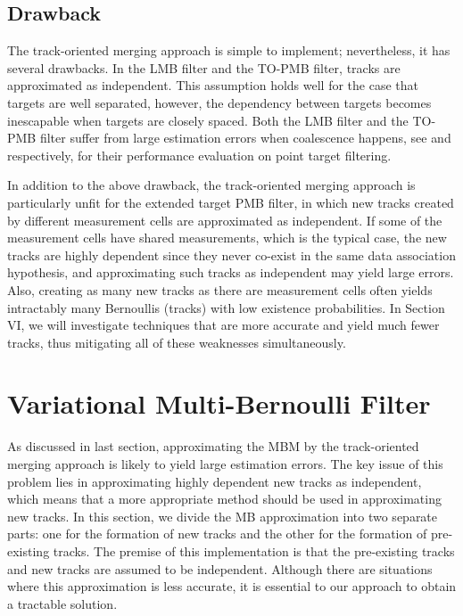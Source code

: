 \documentclass[journal]{IEEEtran}
\begin{document}

\subsection{Drawback}
The track-oriented merging approach is simple to implement; nevertheless, it has several drawbacks. In the LMB filter and the TO-PMB filter, tracks are approximated as independent. This assumption holds well for the case that targets are well separated, however, the dependency between targets becomes inescapable when targets are closely spaced. Both the LMB filter and the TO-PMB filter suffer from large estimation errors when coalescence happens, see \cite{performanceevaluation} and \cite{pmbmpoint} respectively, for their performance evaluation on point target filtering. 

In addition to the above drawback, the track-oriented merging approach is particularly unfit for the extended target PMB filter, in which new tracks created by different measurement cells are approximated as independent. If some of the measurement cells have shared measurements, which is the typical case, the new tracks are highly dependent since they never co-exist in the same data association hypothesis, and approximating such tracks as independent may yield large errors. Also, creating as many new tracks as there are measurement cells often yields intractably many Bernoullis (tracks) with low existence probabilities. In Section VI, we will investigate techniques that are more accurate and yield much fewer tracks, thus mitigating all of these weaknesses simultaneously.

\section{Variational Multi-Bernoulli Filter}

As discussed in last section, approximating the MBM by the track-oriented merging approach is likely to yield large estimation errors. The key issue of this problem lies in approximating highly dependent new tracks as independent, which means that a more appropriate method should be used in approximating new tracks. In this section, we divide the MB approximation into two separate parts: one for the formation of new tracks and the other for the formation of pre-existing tracks. The premise of this implementation is that the pre-existing tracks and new tracks are assumed to be independent. Although there are situations where this approximation is less accurate, it is essential to our approach to obtain a tractable solution. 
\end{document}
